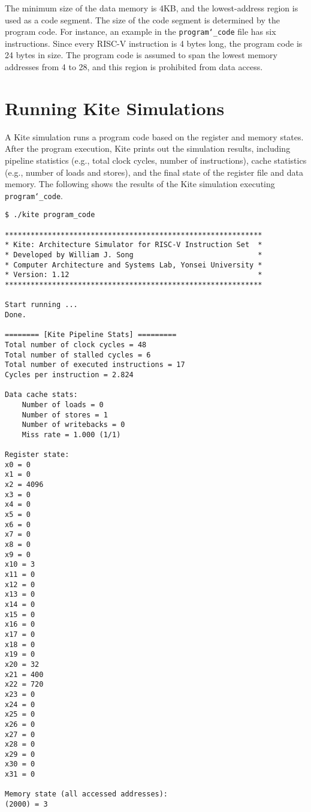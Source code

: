 \documentclass[10pt]{article}
\begin{document}
The minimum size of the data memory is 4KB, and the lowest-address region is used as a code segment.
The size of the code segment is determined by the program code.
For instance, an example in the {\tt\small program\char`_code} file has six instructions.
Since every RISC-V instruction is 4 bytes long, the program code is 24 bytes in size.
The program code is assumed to span the lowest memory addresses from 4 to 28, and this region is prohibited from data access.


\section{Running Kite Simulations} \label{sec:running}
A Kite simulation runs a program code based on the register and memory states.
After the program execution, Kite prints out the simulation results, including pipeline statistics (e.g., total clock cycles, number of instructions), cache statistics (e.g., number of loads and stores), and the final state of the register file and data memory.
The following shows the results of the Kite simulation executing {\tt\small program\char`_code}.

\begin{Verbatim}[frame=single,fontsize=\small]
$ ./kite program_code

************************************************************
* Kite: Architecture Simulator for RISC-V Instruction Set  *
* Developed by William J. Song                             *
* Computer Architecture and Systems Lab, Yonsei University *
* Version: 1.12                                            *
************************************************************

Start running ...
Done.

======== [Kite Pipeline Stats] =========
Total number of clock cycles = 48
Total number of stalled cycles = 6
Total number of executed instructions = 17
Cycles per instruction = 2.824

Data cache stats:
    Number of loads = 0
    Number of stores = 1
    Number of writebacks = 0
    Miss rate = 1.000 (1/1)

Register state:
x0 = 0
x1 = 0
x2 = 4096
x3 = 0
x4 = 0
x5 = 0
x6 = 0
x7 = 0
x8 = 0
x9 = 0
x10 = 3
x11 = 0
x12 = 0
x13 = 0
x14 = 0
x15 = 0
x16 = 0
x17 = 0
x18 = 0
x19 = 0
x20 = 32
x21 = 400
x22 = 720
x23 = 0
x24 = 0
x25 = 0
x26 = 0
x27 = 0
x28 = 0
x29 = 0
x30 = 0
x31 = 0

Memory state (all accessed addresses):
(2000) = 3
\end{Verbatim}
\end{document}
